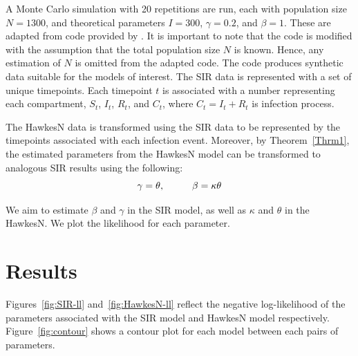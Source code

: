 \documentclass[12pt]{article}
\begin{document}
A Monte Carlo simulation with 20 repetitions are run, each with population size $N = 1300$, and theoretical parameters $I = 300$, $\gamma = 0.2$, and $\beta = 1$. These are adapted from code provided by \citep{Rizoiu2018}.  It is important to note that the code is modified with the assumption that the total population size $N$ is known. Hence, any estimation of $N$ is omitted from the adapted code. The code produces synthetic data suitable for the models of interest. The SIR data is represented with a set of unique timepoints. Each timepoint $t$ is associated with a number representing each compartment, $S_t$, $I_t$, $R_t$, and $C_t$, where $C_t = I_t + R_t$ is infection process. 
 
The HawkesN data is transformed using the SIR data to be represented by the timepoints associated with each infection event. Moreover, by Theorem~\ref{Thrm1}, the estimated parameters from the HawkesN model can be transformed to analogous SIR results using the following:
\[
\gamma = \theta, \hspace{10mm}
\beta = \kappa \theta
\]

We aim to estimate $\beta$ and $\gamma$ in the SIR model, as well as $\kappa$ and $\theta$ in the HawkesN. We plot the likelihood for each parameter. 




\section{Results}

Figures~\ref{fig:SIR-ll} and~\ref{fig:HawkesN-ll} reflect the negative log-likelihood of the parameters associated with the SIR model and HawkesN model respectively. Figure~\ref{fig:contour} shows a contour plot for each model between each pairs of parameters. 
\end{document}
